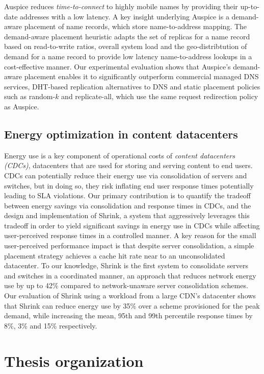 Auspice reduces \emph{time-to-connect} to highly mobile names by providing their up-to-date addresses with a low latency.
A key insight underlying Auspice is a demand-aware placement of name records, which store name-to-address mapping. The demand-aware placement heuristic adapts the set of replicas for a name record based on read-to-write ratios, overall system load and the geo-distribtution of demand for a name record to provide low latency name-to-address lookups in a cost-effective manner. Our experimental evaluation shows that Auspice's demand-aware placement enables it to significantly outperform commercial managed DNS services, DHT-based replication alternatives to DNS and static placement policies such as random-$k$ and replicate-all, which use the same request redirection policy as Auspice.


\subsection{Energy optimization in content datacenters}
\label{sec:intro-cdc}
Energy use is a key component of operational costs of \emph{content datacenters (CDCs)}, datacenters that are used for storing and serving content to end users. CDCs can potentially reduce their energy use via consolidation of servers and switches, but in doing so, they risk inflating end user response times potentially leading to SLA violations. Our primary contribution is to quantify the tradeoff between energy savings via consolidation and response times in CDCs, and the design and implementation of Shrink, a system that aggressively leverages this tradeoff in order to yield significant savings in energy use in CDCs while affecting user-perceived response times in a controlled manner. A key reason for the small user-perceived performance impact is that despite server consolidation, a simple placement strategy achieves a cache hit rate near to an unconsolidated datacenter. To our knowledge, Shrink is the first system to consolidate servers and switches in a coordinated manner, an approach that reduces network energy use by up to 42\% compared to network-unaware server consolidation schemes. Our evaluation of Shrink using a workload from a large CDN's datacenter shows that Shrink can reduce energy use by 35\% over a scheme provisioned for the peak demand, while increasing the mean, 95th and 99th percentile response times by 8\%, 3\% and 15\% respectively.



\section{Thesis organization}

